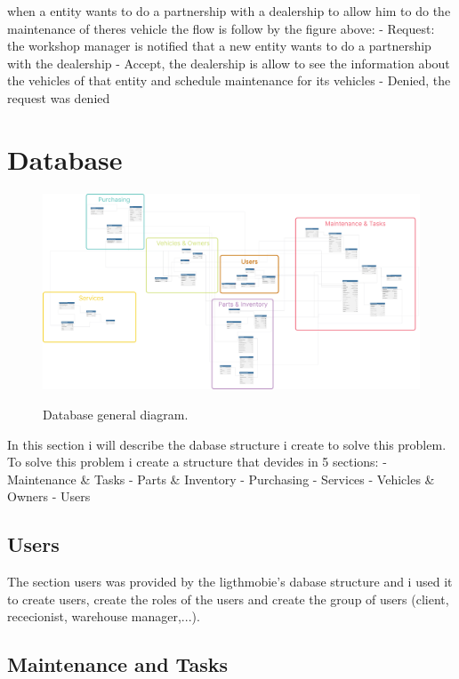 when a entity wants to do a partnership with a dealership to allow him to do the maintenance of theres vehicle the flow is follow by the figure above:
- Request: the workshop manager is notified that a new entity wants to do a partnership with the dealership
- Accept, the dealership is allow to see the information about the vehicles of that entity and schedule maintenance for its vehicles
- Denied, the request was denied


\section{Database} 


\begin{figure}[h]
  \caption{Database general diagram.}
  \centering
  \includegraphics[width=\textwidth]{figs/dbDiagrams/DbDiagramFull}
  \label{fig:figure2} 
\end{figure}

In this section i will describe the dabase structure i create to solve this problem.
To solve this problem i create a structure that devides in 5 sections:
- Maintenance \& Tasks
- Parts \& Inventory 
- Purchasing
- Services
- Vehicles \& Owners
- Users
 

\subsection{Users} 

The section users was provided by the ligthmobie's dabase structure and i used it to create users, create the roles of the users and create the group of users (client, rececionist, warehouse manager,...).



\subsection{Maintenance and Tasks} 



